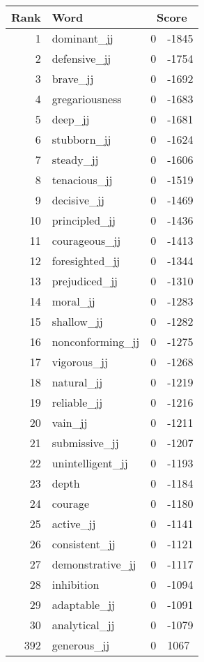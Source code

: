 \begin{longtable}[!htbp]{| rlr@{.}l |}
    \hline
    \textbf{Rank} & \textbf{Word} & \multicolumn{2}{c|}{\textbf{Score}} \\
    \hline
    \endhead
    1 & dominant\_jj & 0 & -1845 \\
    2 & defensive\_jj & 0 & -1754 \\
    3 & brave\_jj & 0 & -1692 \\
    4 & gregariousness & 0 & -1683 \\
    5 & deep\_jj & 0 & -1681 \\
    6 & stubborn\_jj & 0 & -1624 \\
    7 & steady\_jj & 0 & -1606 \\
    8 & tenacious\_jj & 0 & -1519 \\
    9 & decisive\_jj & 0 & -1469 \\
    10 & principled\_jj & 0 & -1436 \\
    11 & courageous\_jj & 0 & -1413 \\
    12 & foresighted\_jj & 0 & -1344 \\
    13 & prejudiced\_jj & 0 & -1310 \\
    14 & moral\_jj & 0 & -1283 \\
    15 & shallow\_jj & 0 & -1282 \\
    16 & nonconforming\_jj & 0 & -1275 \\
    17 & vigorous\_jj & 0 & -1268 \\
    18 & natural\_jj & 0 & -1219 \\
    19 & reliable\_jj & 0 & -1216 \\
    20 & vain\_jj & 0 & -1211 \\
    21 & submissive\_jj & 0 & -1207 \\
    22 & unintelligent\_jj & 0 & -1193 \\
    23 & depth & 0 & -1184 \\
    24 & courage & 0 & -1180 \\
    25 & active\_jj & 0 & -1141 \\
    26 & consistent\_jj & 0 & -1121 \\
    27 & demonstrative\_jj & 0 & -1117 \\
    28 & inhibition & 0 & -1094 \\
    29 & adaptable\_jj & 0 & -1091 \\
    30 & analytical\_jj & 0 & -1079 \\
    392 & generous\_jj & 0 & 1067 \\

\end{longtable}
